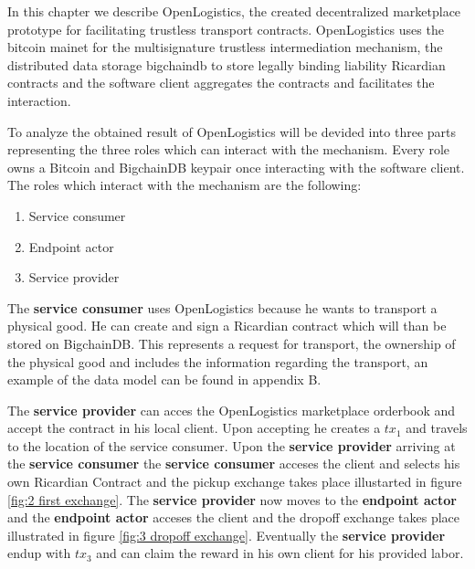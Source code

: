 In this chapter we describe OpenLogistics, the created decentralized  marketplace prototype for facilitating trustless transport contracts. OpenLogistics uses the bitcoin mainet for the multisignature trustless intermediation mechanism, the distributed data storage bigchaindb to store legally binding liability Ricardian contracts and the software client aggregates the contracts and facilitates the interaction. \par
To analyze the obtained result of OpenLogistics will be devided into three parts representing the three roles which can interact with the mechanism. Every role owns a Bitcoin and BigchainDB keypair once interacting with the software client. The roles which interact with the mechanism are the following:
\begin{enumerate}
  \item Service consumer
  \item Endpoint actor
  \item Service provider
\end{enumerate}
The \textbf{service consumer} uses OpenLogistics because he wants to transport a physical good. He can create and sign a Ricardian contract which will than be stored on BigchainDB. This represents a request for transport, the ownership of the physical good and includes the information regarding the transport, an example of the data model can be found in appendix B. \par
The \textbf{service provider} can acces the OpenLogistics marketplace orderbook and accept the contract in his local client. Upon accepting he creates a $tx_1$ and travels to the location of the service consumer. Upon the \textbf{service provider} arriving at the \textbf{service consumer} the \textbf{service consumer} acceses the client and selects his own Ricardian Contract and the pickup exchange takes place illustarted in figure \ref{fig:2 first exchange}. The \textbf{service provider} now moves to the \textbf{endpoint actor} and the \textbf{endpoint actor} acceses the client and the dropoff exchange takes place illustrated in figure \ref{fig:3 dropoff exchange}. Eventually the \textbf{service provider} endup with $tx_3$ and can claim the reward in his own client for his provided labor. \par
%

